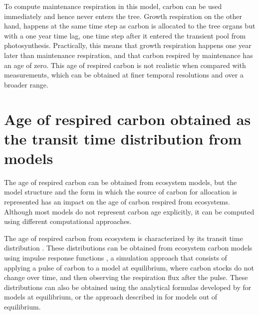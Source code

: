 \documentclass[bg, manuscript]{copernicus}
\begin{document}
To compute maintenance respiration in this model, carbon can be used immediately and hence never enters the tree. Growth respiration on the other hand, happens at the same time step as carbon is allocated to the tree organs but with a one year time lag, one time step after it entered the transient pool from photosynthesis.
Practically, this means that growth respiration happens one year later than maintenance respiration, and that carbon respired by maintenance has an age of zero. 
This age of respired carbon is not realistic when compared with measurements, which can be obtained at finer temporal resolutions and over a broader range. 

\section{Age of respired carbon obtained as the transit time distribution from models}
The age of respired carbon can be obtained from ecosystem models, but the model structure and the form in which the source of carbon for allocation is represented has an impact on the age of carbon respired from ecosystems. Although most models do not represent carbon age explicitly, it can be computed using different computational approaches.

The age of respired carbon from ecosystem is characterized by its transit time distribution \citep{Bolin1973, Thompson1999, Sierra2021JE}. These distributions can be obtained from ecosystem carbon models using impulse response functions \citep{Thompson1999}, a simulation approach that consists of applying a pulse of carbon to a model at equilibrium, where carbon stocks do not change over time, and then observing the respiration flux after the pulse. These distributions can also be obtained using the analytical formulas developed by \citet{Metzler2018MG} for models at equilibrium, or the approach described in \citet{Metzler2018PNAS} for models out of equilibrium.
\end{document}
